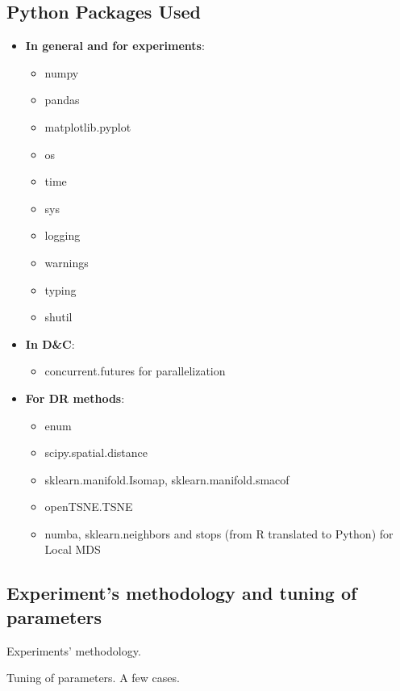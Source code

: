 \subsection{Python Packages Used}

\begin{itemize}
    \item \textbf{In general and for experiments}: \begin{itemize}
        \item numpy
        \item pandas
        \item matplotlib.pyplot
        \item os
        \item time
        \item sys
        \item logging
        \item warnings
        \item typing
        \item shutil
    \end{itemize}
    \item \textbf{In D\&C}: \begin{itemize}
        \item concurrent.futures for parallelization
    \end{itemize}

    \item \textbf{For DR methods}: \begin{itemize}
        \item enum
        \item scipy.spatial.distance
        \item sklearn.manifold.Isomap, sklearn.manifold.smacof
        \item openTSNE.TSNE
        \item numba, sklearn.neighbors and stops (from R translated to Python) for Local MDS
    \end{itemize}
\end{itemize}

\subsection{Experiment's methodology and tuning of parameters}

Experiments' methodology.

Tuning of parameters. A few cases.